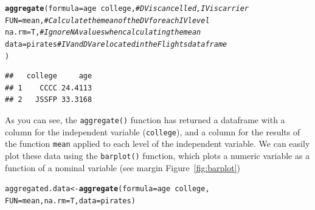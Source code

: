 \documentclass{tufte-book}\usepackage[]{graphicx}\usepackage[]{color}
\makeatletter
\newcommand{\hlcom}[1]{\textcolor[rgb]{0.678,0.584,0.686}{\textit{#1}}}%
\newcommand{\hlopt}[1]{\textcolor[rgb]{0,0,0}{#1}}%
\newcommand{\hlstd}[1]{\textcolor[rgb]{0.345,0.345,0.345}{#1}}%
\newcommand{\hlkwb}[1]{\textcolor[rgb]{0.69,0.353,0.396}{#1}}%
\newcommand{\hlkwc}[1]{\textcolor[rgb]{0.333,0.667,0.333}{#1}}%
\newcommand{\hlkwd}[1]{\textcolor[rgb]{0.737,0.353,0.396}{\textbf{#1}}}%
\newenvironment{kframe}{%
 \def\at@end@of@kframe{}%
 \ifinner\ifhmode%
  \def\at@end@of@kframe{\end{minipage}}%
  \begin{minipage}{\columnwidth}%
 \fi\fi%
 \def\FrameCommand##1{\hskip\@totalleftmargin \hskip-\fboxsep
 \colorbox{shadecolor}{##1}\hskip-\fboxsep
     \hskip-\linewidth \hskip-\@totalleftmargin \hskip\columnwidth}%
 \MakeFramed {\advance\hsize-\width
   \@totalleftmargin\z@ \linewidth\hsize
   \@setminipage}}%
 {\par\unskip\endMakeFramed%
 \at@end@of@kframe}
\newenvironment{knitrout}{}{} %
\makeatother
\begin{document}
\begin{footnotesize}
\begin{footnotesize}
\begin{knitrout}
\color{fgcolor}\begin{kframe}
\begin{alltt}
\hlkwd{aggregate}\hlstd{(}\hlkwc{formula} \hlstd{= age} \hlopt{~} \hlstd{college,}  \hlcom{# DV is cancelled, IV is carrier}
          \hlkwc{FUN} \hlstd{= mean,} \hlcom{# Calculate the mean of the DV for each IV level}
          \hlkwc{na.rm} \hlstd{= T,} \hlcom{# Ignore NA values when calculating the mean}
          \hlkwc{data} \hlstd{= pirates} \hlcom{# IV and DV are located in the Flights dataframe}
          \hlstd{)}
\end{alltt}
\begin{verbatim}
##   college     age
## 1    CCCC 24.4113
## 2   JSSFP 33.3168
\end{verbatim}
\end{kframe}
\end{knitrout}
\end{footnotesize}


As you can see, the \texttt{aggregate()} function has returned a dataframe with a column for the independent variable (\texttt{college}), and a column for the results of the function \texttt{mean} applied to each level of the independent variable. We can easily plot these data using the \texttt{barplot()} function, which plots a numeric variable as a function of a nominal variable (see margin Figure~\ref{fig:barplot})

\begin{marginfigure}
\begin{tiny}
\begin{knitrout}
\color{fgcolor}\begin{kframe}
\begin{alltt}
\hlstd{aggregated.data} \hlkwb{<-} \hlkwd{aggregate}\hlstd{(}\hlkwc{formula} \hlstd{= age} \hlopt{~} \hlstd{college,}
                             \hlkwc{FUN} \hlstd{= mean,} \hlkwc{na.rm} \hlstd{= T,} \hlkwc{data} \hlstd{= pirates)}


\end{alltt}
\end{kframe}
\end{knitrout}
\end{tiny}
\end{marginfigure}
\end{footnotesize}
\end{document}
